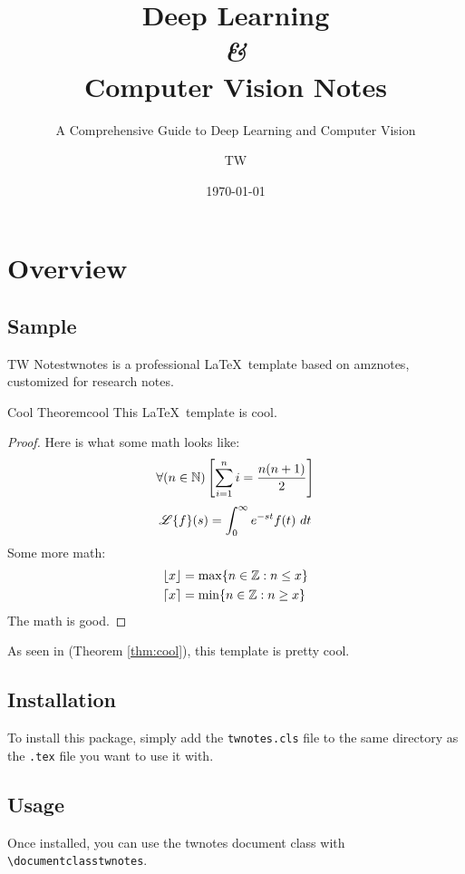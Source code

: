 \documentclass[math,code,cn,localfonts]{twnotes} %
\title{Deep Learning\\
	\textit{\&} \\ 
	Computer Vision Notes}
\subtitle{A Comprehensive Guide to Deep Learning and Computer Vision}
\author{TW}
\date{\today}
\begin{document}
	
	\maketitle
	
	\tableofcontents
	
	\chapter{Overview}
	
	\section{Sample}
	
	\begin{dfnbox}{TW Notes}{twnotes}
		 is a professional \LaTeX\ template based on amznotes, customized for research notes.
	\end{dfnbox}
	
	\begin{thmbox}{Cool Theorem}{cool}
		This \LaTeX\ template is cool.
		\tcblower
		\begin{proof}
			Here is what some math looks like:
			\[ \forall (n \in \mathbb{N}) \left[ \sum_{i=1}^n i = \frac{n(n+1)}{2} \right] \]
			\[ \operatorname{\mathscr{L}} \{ f \} (s) = \int_{0}^{\infty} e^{-st} f(t)\ dt \]
			Some more math:
			\begin{align*}
				\lfloor x\rfloor &= \max \{ n \in \mathbb{Z} : n \leq x \} \\
				\lceil x\rceil &= \min \{ n \in \mathbb{Z} : n \geq x \}
			\end{align*}
			The math is good.
		\end{proof}
	\end{thmbox}
	
	As seen in  (Theorem \ref{thm:cool}), this template is pretty cool.
	
	\section{Installation}
	To install this package, simply add the \texttt{twnotes.cls} file to the same directory as the \texttt{.tex} file you want to use it with.
	
	\section{Usage}
	Once installed, you can use the twnotes document class with \texttt{\textbackslash documentclass\textbraceleft twnotes\textbraceright}.
	
\end{document}
